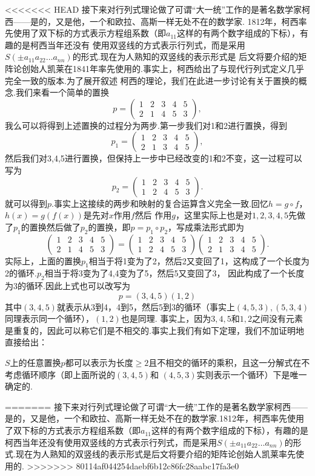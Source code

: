 <<<<<<< HEAD
接下来对行列式理论做了可谓``大一统''工作的是著名数学家柯西——是的，又是他，一个和欧拉、高斯一样无处不在的数学家.
1812年，柯西率先使用了双下标的方式表示方程组系数（即$a_{11}$这样的有两个数字组成的下标），有趣的是柯西当年还没有
使用双竖线的方式表示行列式，而是采用$S(\pm a_{11}a_{22}\ldots a_{nn})$的形式.现在为人熟知的双竖线的表示形式是
后文将要介绍的矩阵论创始人凯莱在1841年率先使用的.事实上，柯西给出了与现代行列式定义几乎完全一致的版本.为了展开叙述
柯西的理论，我们在此进一步讨论有关于置换的概念.我们来看一个简单的置换
\[p=\begin{pmatrix}
    1&2&3&4&5\\
    2&1&4&5&3
\end{pmatrix},\]
我么可以将得到上述置换的过程分为两步.第一步我们对1和2进行置换，得到
\[p_1=\begin{pmatrix}
    1&2&3&4&5\\
    2&1&3&4&5
\end{pmatrix},\]
然后我们对3,4,5进行置换，但保持上一步中已经改变的1和2不变，这一过程可以写为
\[p_2=\begin{pmatrix}
    1&2&3&4&5\\
    1&2&4&5&3
\end{pmatrix}.\]
就可以得到$p$.事实上这接续的两步和映射的复合运算含义完全一致.回忆$h=g\circ f$，$h(x)=g(f(x))$是先对$x$作用$f$然后
作用$g$，这里实际上也是对$1,2,3,4,5$先做了$p_1$的置换然后做了$p_2$的置换，即$p=p_1\circ p_2$，写成乘法形式即为
\[\begin{pmatrix}
    1&2&3&4&5\\
    2&1&4&5&3
\end{pmatrix}=\begin{pmatrix}
    1&2&3&4&5\\
    1&2&4&5&3
\end{pmatrix}\begin{pmatrix}
    1&2&3&4&5\\
    2&1&3&4&5
\end{pmatrix}.\]
实际上，上面的置换$p_1$相当于将1变为了2，然后2又变回了1，这构成了一个长度为2的循环.$p_2$相当于将3变为了4,4变为了5，然后5又变回了3，
因此构成了一个长度为3的循环.因此上式也可以改写为
\[p=(3,4,5)(1,2)\]
其中$(3,4,5)$就表示从3到4，4到5，然后5到3的循环（事实上$(4,5,3),(5,3,4)$同理表示同一个循环），$(1,2)$也是同理.
事实上，因为$3,4,5$和$1,2$之间没有元素是重复的，因此可以称它们是不相交的.事实上我们有如下定理，我们不加证明地直接给出：
\begin{theorem}
    $S$上的任意置换$p$都可以表示为长度$\geqslant 2$且不相交的循环的乘积，且这一分解式在不考虑循环顺序（即上面所说的$(3,4,5)$和
    $(4,5,3)$实则表示一个循环）下是唯一确定的.
\end{theorem}
=======
接下来对行列式理论做了可谓``大一统''工作的是著名数学家柯西——是的，又是他，一个和欧拉、高斯一样无处不在的数学家.1812年，柯西率先使用了双下标的方式表示方程组系数（即$a_{11}$这样的有两个数字组成的下标），有趣的是柯西当年还没有使用双竖线的方式表示行列式，而是采用$S(\pm a_{11}a_{22}\ldots a_{nn})$的形式.现在为人熟知的双竖线的表示形式是后文将要介绍的矩阵论创始人凯莱率先使用的.
>>>>>>> 80114af044254daebf6b12c86fc28aabc17fa3e0

